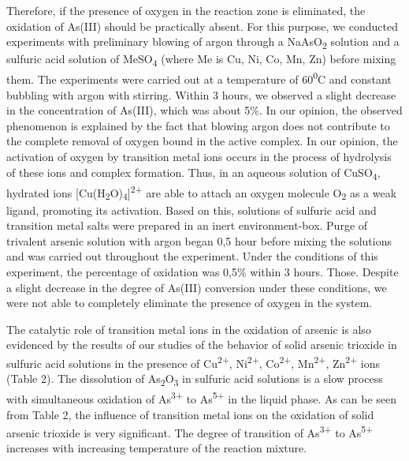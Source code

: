 \begin{multicols}{2}
Therefore, if the presence of oxygen in the reaction zone is eliminated,
the oxidation of As(III) should be practically absent. For this purpose,
we conducted experiments with preliminary blowing of argon through a
NaAsO\textsubscript{2} solution and a sulfuric acid solution of
MeSO\textsubscript{4} (where Me is Cu, Ni, Co, Mn, Zn) before mixing
them. The experiments were carried out at a temperature of
60\textsuperscript{0}C and constant bubbling with argon with stirring.
Within 3 hours, we observed a slight decrease in the concentration of
As(III), which was about 5\%. In our opinion, the observed phenomenon is
explained by the fact that blowing argon does not contribute to the
complete removal of oxygen bound in the active complex. In our opinion,
the activation of oxygen by transition metal ions occurs in the process
of hydrolysis of these ions and complex formation. Thus, in an aqueous
solution of CuSO\textsubscript{4}, hydrated ions
{[}Cu(H\textsubscript{2}O)\textsubscript{4}{]}\textsuperscript{2+} are
able to attach an oxygen molecule O\textsubscript{2} as a weak ligand,
promoting its activation. Based on this, solutions of sulfuric acid and
transition metal salts were prepared in an inert environment-box. Purge
of trivalent arsenic solution with argon began 0,5 hour before mixing
the solutions and was carried out throughout the experiment. Under the
conditions of this experiment, the percentage of oxidation was 0,5\%
within 3 hours. Those. Despite a slight decrease in the degree of
As(III) conversion under these conditions, we were not able to
completely eliminate the presence of oxygen in the system.

The catalytic role of transition metal ions in the oxidation of arsenic
is also evidenced by the results of our studies of the behavior of solid
arsenic trioxide in sulfuric acid solutions in the presence of
Cu\textsuperscript{2+}, Ni\textsuperscript{2+}, Co\textsuperscript{2+},
Mn\textsuperscript{2+}, Zn\textsuperscript{2+} ions (Table 2). The
dissolution of As\textsubscript{2}O\textsubscript{3} in sulfuric acid
solutions is a slow process with simultaneous oxidation of
As\textsuperscript{3+} to As\textsuperscript{5+} in the liquid phase. As
can be seen from Table 2, the influence of transition metal ions on the
oxidation of solid arsenic trioxide is very significant. The degree of
transition of As\textsuperscript{3+} to As\textsuperscript{5+} increases
with increasing temperature of the reaction mixture.
\end{multicols}

